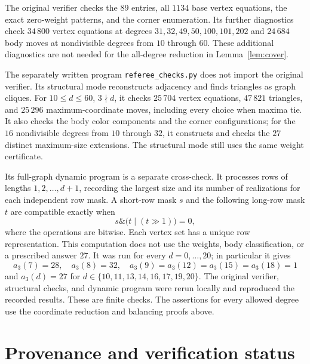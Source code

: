 \documentclass[11pt]{article}
\begin{document}
The original verifier checks the \(89\) entries, all \(1134\)
base vertex equations, the exact zero-weight patterns, and the
corner enumeration. Its further diagnostics check \(34\,800\)
vertex equations at degrees \(31,32,49,50,100,101,202\) and
\(24\,684\) body moves at nondivisible degrees from \(10\) through \(60\).
These additional diagnostics are not needed for the
all-degree reduction in Lemma~\ref{lem:cover}.

The separately written program \texttt{referee\_checks.py} does
not import the original verifier.
Its structural mode reconstructs adjacency and finds triangles
as graph cliques. For \(10\leq d\leq60\), \(3\nmid d\), it checks
\(25\,704\) vertex equations, \(47\,821\) triangles, and \(25\,296\)
maximum-coordinate moves, including every choice when maxima tie.
It also checks the body color components and the corner
configurations; for the \(16\) nondivisible degrees from \(10\)
through \(32\), it constructs and checks the \(27\) distinct
maximum-size extensions. The structural mode still uses the same
weight certificate.

Its full-graph dynamic program is a separate cross-check.
It processes rows of lengths \(1,2,\ldots,d+1\), recording the
largest size and its number of realizations for each independent
row mask. A short-row mask \(s\) and the following long-row mask
\(t\) are compatible exactly when
\[
 s\mathbin{\&}\bigl(t\mathbin{|}(t\mathbin{\gg}1)\bigr)=0,
\]
where the operations are bitwise. Each vertex set has a unique
row representation. This computation does not use the weights,
body classification, or a prescribed answer \(27\).
It was run for every \(d=0,\ldots,20\); in particular it gives
\[
 a_3(7)=28,\quad a_3(8)=32,\quad
 a_3(9)=a_3(12)=a_3(15)=a_3(18)=1
\]
and \(a_3(d)=27\) for
\(d\in\{10,11,13,14,16,17,19,20\}\).
The original verifier, structural checks, and dynamic program
were rerun locally and reproduced the recorded results.
These are finite checks. The assertions for every allowed degree
use the coordinate reduction and balancing proofs above.

\section{Provenance and verification status}\label{sec:provenance}
\end{document}
